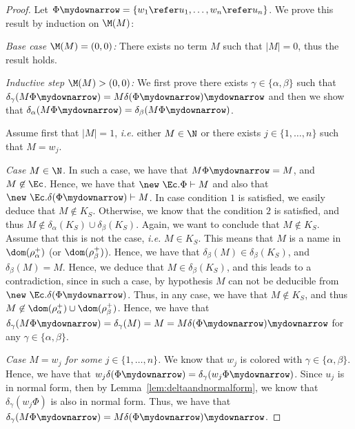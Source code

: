\begin{proof}
Let $\Phi\mydownarrow =\{w_1 \refer u_1,\ldots, w_n \refer u_n\}$.
We prove this result by induction on $\M(M)$:

\medskip

\noindent\emph{Base case $\M(M) = (0,0)$:} There exists no term $M$ such that $|M| = 0$, thus the result holds.

\medskip

\noindent\emph{Inductive step $\M(M) > (0,0)$:} We first prove there exists $\gamma
\in \{\alpha, \beta\}$ such that $\delta_{\gamma}(M\Phi\mydownarrow) =
M\delta(\Phi\mydownarrow)\mydownarrow$ and then we show that
$\delta_\alpha(M\Phi\mydownarrow) = \delta_\beta(M\Phi\mydownarrow)$.

\medskip{}

Assume first that $|M| = 1$, \emph{i.e.} either $M\in\N$ or there exists $j \in \{1,
\ldots, n\}$ such that $M = w_j$. 

\noindent \emph{Case $M\in \N$.} In such a case, we have that
$M\Phi\mydownarrow = M$, and $M \not\in \Ec$. Hence, we have that 
$\new \ \Ec. \Phi \vdash M$ and also that $\new\
\Ec. \delta(\Phi\mydownarrow) \vdash M$. {In case condition $1$ is
satisfied, we easily deduce that $M \not\in K_S$. Otherwise, we know
that the condition $2$ is satisfied, and thus $M \not\in
\delta_\alpha(K_S) \cup \delta_\beta(K_S)$. Again, we want to conclude
that $M \not\in K_S$. Assume that this is not the case, \emph{i.e.} $M \in
K_S$. This means that $M$ is a name in $\dom(\rho^+_\alpha)$ (or
$\dom(\rho^+_\beta)$). Hence, we  have that $\delta_\beta(M) \in
\delta_\beta(K_S)$, and {$\delta_\beta(M) = M$}. Hence, we
deduce that $M \in \delta_\beta(K_S)$, and this leads to a
contradiction, since in such a case, by hypothesis $M$ can not be deducible from $\new\
\Ec. \delta(\Phi\mydownarrow)$.} 
Thus, in any case, we have that  $M \not\in K_S$, and
thus $M \not\in \dom(\rho^+_\alpha) \cup \dom(\rho^+_\beta)$.
Hence, we have that 
$\delta_\gamma(M\Phi\mydownarrow) =
\delta_\gamma(M) = M = M\delta(\Phi\mydownarrow)\mydownarrow$ for any $\gamma\in\{\alpha, \beta\}$.

\noindent \emph{Case $M = w_j$ for some $j \in \{1,\ldots,n\}$.} 
We know that $w_j$ is colored with $\gamma \in \{\alpha,\beta\}$. Hence, we have
that  $w_j\delta(\Phi\mydownarrow) =
\delta_\gamma(w_j\Phi\mydownarrow)$. Since $u_j$ is in normal form, then by
Lemma~\ref{lem:deltaandnormalform}, 
we know that $\delta_\gamma(w_j\Phi)$ is also in
normal form. Thus, we have that $\delta_\gamma(M\Phi\mydownarrow) =
M\delta(\Phi\mydownarrow)\mydownarrow$.


\end{proof}
